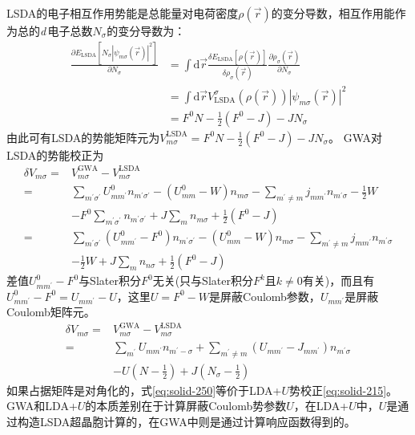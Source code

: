 LSDA的电子相互作用势能是总能量对电荷密度$\rho(\vec r)$的变分导数，相互作用能作为总的{\it d}\,电子总数$N_{\sigma}$的变分导数为：
\begin{equation}
  \begin{split}
	  \frac{\partial E_{\mathrm{LSDA}}[N_{\sigma}|\psi_{m\sigma}(\vec r)|^2]}{\partial N_{\sigma}}&=\int\mathrm{d}\vec r\frac{\delta E_{\mathrm{LSDA}}[\rho(\vec r)]}{\delta\rho_{\sigma}(\vec r)}\frac{\partial\rho_{\sigma}(\vec r)}{\partial N_{\sigma}}\\
	  &=\int\mathrm{d}\vec rV_{\mathrm{LSDA}}^{\sigma}(\rho(\vec r))|\psi_{m\sigma}(\vec r)|^2\\
    &=F^0N-\frac12(F^0-J)-JN_{\sigma}
  \end{split}
  \label{eq:solid-257}
\end{equation}
由此可有LSDA的势能矩阵元为$V_{m\sigma}^{\mathrm{LSDA}}=F^0N-\frac12(F^0-J)-JN_{\sigma}$。
GWA对LSDA的势能校正为\cite{JPCM9-767_1997}
\begin{equation}
  \begin{split}
	  \delta V_{m\sigma}=&V_{m\sigma}^{\mathrm{GWA}}-V_{m\sigma}^{\mathrm{LSDA}}\\
    =&\sum_{m^{\prime}\sigma^{\prime}}U_{mm^{\prime}}^0n_{m^{\prime}\sigma^{\prime}}-(U_{mm}^0-W)n_{m\sigma}-\sum_{m^{\prime}\neq m}j_{mm^{\prime}}n_{m^{\prime}\sigma}-\frac12W\\
    &-F^0\sum_{m^{\prime}\sigma^{\prime}}n_{m^{\prime}\sigma^{\prime}}+J\sum_mn_{m\sigma}+\frac12(F^0-J)\\
    =&\sum_{m^{\prime}\sigma^{\prime}}(U_{mm^{\prime}}^0-F^0)n_{m^{\prime}\sigma^{\prime}}-(U_{mm}^0-W)n_{m\sigma}-\sum_{m^{\prime}\neq m}j_{mm^{\prime}}n_{m^{\prime}\sigma}\\
    &-\frac12W+J\sum_mn_{n\sigma}+\frac12(F^0-J)
  \end{split}
  \label{eq:solid-249}
\end{equation}
差值$U_{mm^{\prime}}^0-F^0$与Slater积分$F^0$无关(只与Slater积分$F^k$且$k\neq0$有关)，而且有$U_{mm^{\prime}}^0-F^0=U_{mm^{\prime}}-U$，这里$U=F^0-W$是屏蔽Coulomb参数，$U_{mm^{\prime}}$是屏蔽Coulomb矩阵元。
\begin{equation}
  \begin{split}
	  \delta V_{m\sigma}=&V_{m\sigma}^{\mathrm{GWA}}-V_{m\sigma}^{\mathrm{LSDA}}\\
    =&\sum_{m^{\prime}}U_{mm^{\prime}}n_{m^{\prime}-\sigma}+\sum_{m^{\prime}\neq m}(U_{mm^{\prime}}-J_{mm^{\prime}})n_{m^{\prime}\sigma}\\
    &-U(N-\frac12)+J(N_{\sigma}-\frac12)
  \end{split}
  \label{eq:solid-250}
\end{equation}
如果占据矩阵是对角化的，式\eqref{eq:solid-250}等价于LDA+$U$势校正\eqref{eq:solid-215}。GWA和LDA+$U$的本质差别在于计算屏蔽Coulomb势参数$U$，在LDA+$U$中，$U$是通过构造LSDA超晶胞计算的，在GWA中则是通过计算响应函数得到的。
%
